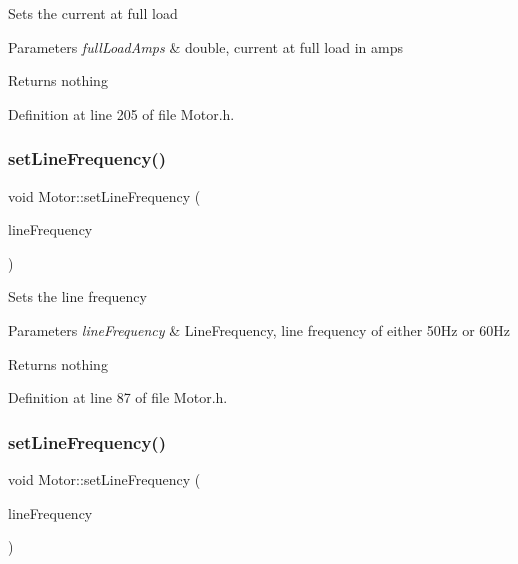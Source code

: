 Sets the current at full load


\begin{DoxyParams}{Parameters}
{\em full\+Load\+Amps} & double, current at full load in amps\\
\hline
\end{DoxyParams}
\begin{DoxyReturn}{Returns}
nothing 
\end{DoxyReturn}


Definition at line 205 of file Motor.\+h.

\mbox{\label{class_motor_a450e5ecea25b05413b731379f153c3f1}} 
\subsubsection{\texorpdfstring{set\+Line\+Frequency()}{setLineFrequency()}\hspace{0.1cm}{\footnotesize\ttfamily [1/3]}}
{\footnotesize\ttfamily void Motor\+::set\+Line\+Frequency (\begin{DoxyParamCaption}\item[{\hyperlink{class_motor_acee1bdf1b684ad36cb80dc2829d9fcee}{Line\+Frequency}}]{line\+Frequency }\end{DoxyParamCaption})\hspace{0.3cm}{\ttfamily [inline]}}

Sets the line frequency


\begin{DoxyParams}{Parameters}
{\em line\+Frequency} & Line\+Frequency, line frequency of either 50\+Hz or 60\+Hz\\
\hline
\end{DoxyParams}
\begin{DoxyReturn}{Returns}
nothing 
\end{DoxyReturn}


Definition at line 87 of file Motor.\+h.

\mbox{\label{class_motor_a450e5ecea25b05413b731379f153c3f1}} 
\subsubsection{\texorpdfstring{set\+Line\+Frequency()}{setLineFrequency()}\hspace{0.1cm}{\footnotesize\ttfamily [2/3]}}
{\footnotesize\ttfamily void Motor\+::set\+Line\+Frequency (\begin{DoxyParamCaption}\item[{\hyperlink{class_motor_acee1bdf1b684ad36cb80dc2829d9fcee}{Line\+Frequency}}]{line\+Frequency }\end{DoxyParamCaption})\hspace{0.3cm}{\ttfamily [inline]}}

